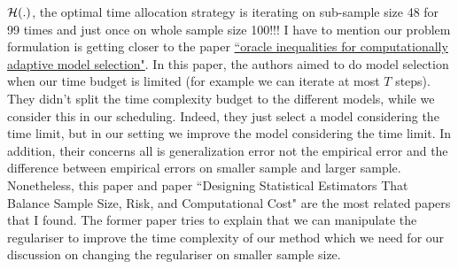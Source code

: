 \documentclass{article}
\newcommand{\bound}{{\cal H}}
\begin{document}
   $\bound(.)$, the optimal time allocation strategy is iterating on sub-sample
   size 48 for 99 times and just once on whole sample size 100!!! I
   have to mention our problem formulation is getting closer to the paper \href{http://arxiv.org/pdf/1208.0129.pdf}{``oracle inequalities for computationally adaptive model selection"}.
    In this paper, the authors aimed
   to do model selection when our time budget is limited (for example we can
   iterate at most $T$ steps). They didn't split the
   time complexity budget to the different models, while we consider this in our
   scheduling. Indeed, they just select a model considering the time limit,
   but in our setting we improve the model considering the time limit. In
   addition, their concerns all is generalization error not the empirical 
   error and the difference between empirical errors on smaller sample and
   larger sample. Nonetheless, this paper and paper 
   ``Designing Statistical Estimators That Balance Sample Size, Risk, and Computational Cost"
are the most related papers that I found. The former paper tries to explain that
we can manipulate the regulariser to improve the time complexity of our method
which we need for our discussion on changing the regulariser on smaller sample
size. 
\end{document}
